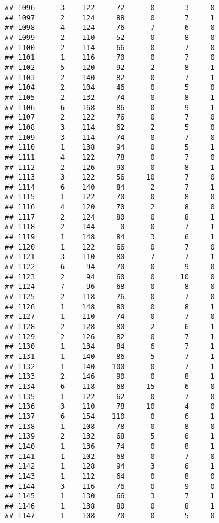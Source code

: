 \documentclass[
]{article}
\begin{document}
\begin{verbatim}
## 1096      3    122     72      0       3     0
## 1097      2    124     88      0       7     1
## 1098      4    124     76      7       6     0
## 1099      2    110     52      0       8     0
## 1100      2    114     66      0       7     0
## 1101      1    116     70      0       7     0
## 1102      5    120     92      2       8     1
## 1103      2    140     82      0       7     1
## 1104      2    104     46      0       5     0
## 1105      2    132     74      0       8     1
## 1106      6    168     86      0       9     1
## 1107      2    122     76      0       7     0
## 1108      3    114     62      2       5     0
## 1109      3    114     74      0       7     0
## 1110      1    138     94      0       5     1
## 1111      4    122     78      0       7     0
## 1112      2    126     90      0       8     1
## 1113      3    122     56     10       7     0
## 1114      6    140     84      2       7     1
## 1115      1    122     70      0       8     0
## 1116      4    120     70      2       8     0
## 1117      2    124     80      0       8     1
## 1118      2    144      0      0       7     1
## 1119      1    148     84      3       6     1
## 1120      1    122     66      0       7     0
## 1121      3    110     80      7       7     1
## 1122      6     94     70      0       9     0
## 1123      2     94     60      0      10     0
## 1124      7     96     68      0       8     0
## 1125      2    118     76      0       7     0
## 1126      1    148     80      0       8     1
## 1127      1    110     74      0       7     0
## 1128      2    128     80      2       6     1
## 1129      2    126     82      0       7     1
## 1130      1    134     84      6       7     1
## 1131      1    140     86      5       7     1
## 1132      1    140    100      0       7     1
## 1133      2    146     90      0       8     1
## 1134      6    118     68     15       6     0
## 1135      1    122     62      0       7     0
## 1136      3    110     78     10       4     0
## 1137      6    154    110      0       6     1
## 1138      1    108     78      0       8     0
## 1139      2    132     68      5       6     1
## 1140      1    136     74      0       8     1
## 1141      1    102     68      0       7     0
## 1142      1    128     94      3       6     1
## 1143      1    112     64      0       8     0
## 1144      3    116     76      0       9     0
## 1145      1    130     66      3       7     1
## 1146      1    138     80      0       8     1
## 1147      1    108     70      0       5     0

\end{verbatim}
\end{document}
